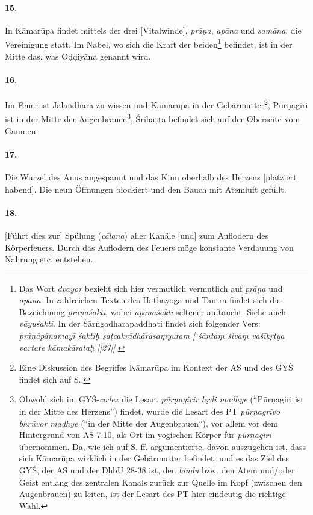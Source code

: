 \documentclass[a4paper,12pt]{article}
\begin{document}
\paragraph{15.} In Kāmarūpa findet mittels der drei [Vitalwinde], \textit{prāṇa}, \textit{apāna} und \textit{samāna}, die Vereinigung statt. 
Im Nabel, wo sich die Kraft der beiden\footnote{Das Wort \textit{dvayor} bezieht sich hier vermutlich vermutlich auf \textit{prāṇa} und \textit{apāna}. In zahlreichen Texten des Haṭhayoga und Tantra findet sich die Bezeichnung \textit{prāṇaśakti}, wobei \textit{apānaśakti} seltener auftaucht. Siehe auch \textit{vāyuśakti}. In der Śārṅgadharapaddhati findet sich folgender Vers: \textit{prāṇāpānamayī śaktiḥ ṣaṭcakrādhārasaṃyutam | śāntaṃ śivaṃ vaśīkṛtya vartate kāmakārataḥ ||27||} \parencite[654]{peterson1888}} befindet, ist in der Mitte das, was Oḍḍiyāna genannt wird.

\paragraph{16.} Im Feuer ist Jālandhara zu wissen und Kāmarūpa in der Gebärmutter\footnote{Eine Diskussion des Begriffes Kāmarūpa im Kontext der AS und des GYŚ findet sich auf S.\pageref{kamarupa}.}, Pūrṇagiri ist in der Mitte der Augenbrauen\footnote{Obwohl sich im GYŚ-\textit{codex} die Lesart \textit{pūrṇagirir hṛdi madhye} (``Pūrṇagiri ist in der Mitte des Herzens'') findet, wurde die Lesart des PT \textit{pūrṇagrīvo bhrūvor madhye} (``in der Mitte der Augenbrauen''), vor allem vor dem Hintergrund von AS 7.10, als Ort im yogischen Körper für \textit{pūrṇagiri} übernommen. Da, wie ich auf S. \pageref{kamarupa} ff. argumentierte, davon auszugehen ist, dass sich Kāmarūpa wirklich in der Gebärmutter befindet, und es das Ziel des GYŚ, der AS und der DhbU 28-38 ist, den \textit{bindu} bzw. den Atem und/oder Geist entlang des zentralen Kanals zurück zur Quelle im Kopf (zwischen den Augenbrauen) zu leiten, ist der Lesart des PT hier eindeutig die richtige Wahl.}, Śrihaṭṭa befindet sich auf der Oberseite vom Gaumen. 

\paragraph{17.} Die Wurzel des Anus angespannt und das Kinn oberhalb des Herzens [platziert habend]. Die neun Öffnungen blockiert und den Bauch mit Atemluft gefüllt.

\paragraph{18.} [Führt dies zur] Spülung (\textit{cālana}) aller Kanäle [und] zum Auflodern des Körperfeuers. Durch das Auflodern des Feuers möge konstante Verdauung von Nahrung etc. entstehen.
\end{document}
